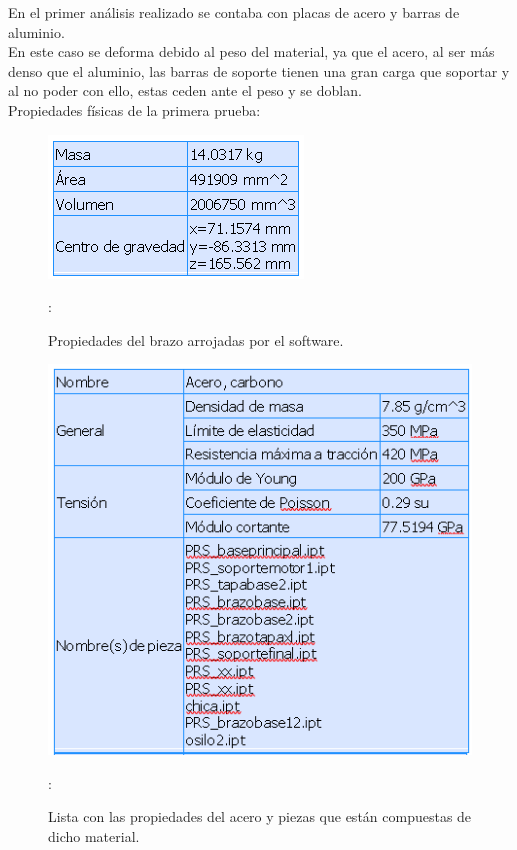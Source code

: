 \documentclass[11pt,a4paper,oldfontcommands,oneside]{memoir}
\begin{document}
\begin{flushleft}

En el primer análisis realizado se contaba con placas de acero y barras de aluminio. \\
En este caso se deforma debido al peso del material, ya que el acero, al ser más denso que el aluminio, las barras de soporte tienen una gran carga que soportar y al no poder con ello, estas ceden ante el peso y se doblan.\\
Propiedades físicas de la primera prueba: 

\begin{figure}
\begin{center}
\includegraphics[scale=.95]{prop1.png}
\end{center}
\caption{Propiedades del brazo arrojadas por el software.}
\label{tabla1}:
\end{figure}

\begin{figure}
\begin{center}
\includegraphics[scale=.85]{acero1.png}
\end{center}
\caption{Lista con las propiedades del acero y piezas que están compuestas de dicho material.}
\label{tabla2}:
\end{figure}


\end{flushleft}
\end{document}
